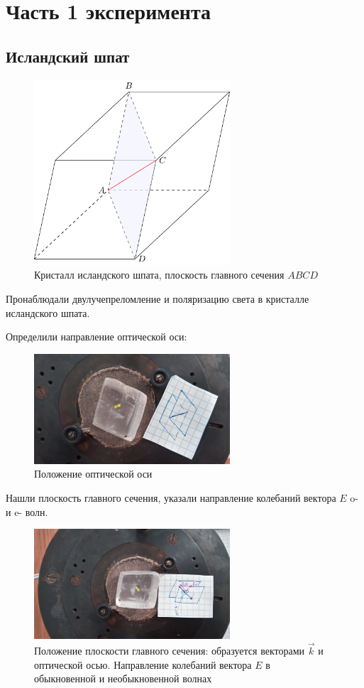 \newpage
\section{Часть 1 эксперимента}
\subsection{Исландский шпат}
\begin{figure}[H]
	\centering
	\includegraphics[width=0.65\textwidth]{pic/pic5.pdf}
	\caption{Кристалл исландского шпата, плоскость главного сечения $ABCD$}
	\label{fig:figure1}
\end{figure}
Пронаблюдали двулучепреломление и поляризацию света в кристалле исландского шпата. 

Определили направление оптической оси:
\begin{figure}[H]
	\centering
	\includegraphics[width=0.65\textwidth]{pic/rot_eo.jpg}
	\caption{Положение оптической оси}
	\label{fig:figure1}
\end{figure}

Нашли плоскость главного сечения, указали направление колебаний вектора $E$ o- и e- волн.
\begin{figure}[H]
	\centering
	\includegraphics[width=0.65\textwidth]{pic/eo.jpg}
	\caption{Положение плоскости главного сечения: образуется векторами $\vec{k}$ и оптической осью. Направление колебаний вектора $E$ в обыкновенной и необыкновенной волнах}
	\label{fig:figure1}
\end{figure}


